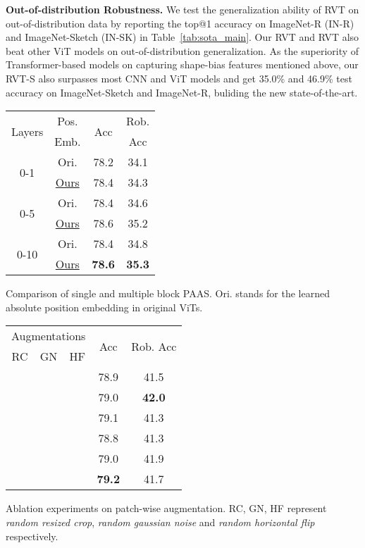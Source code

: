 \documentclass[10pt,twocolumn,letterpaper]{article}
\makeatletter
\newcommand{\tablestyle}[2]{\setlength{\tabcolsep}{#1}\renewcommand{\arraystretch}{#2}\centering\footnotesize}
\newcommand{\cmark}{\ding{51}}\newcommand{\tabincell}[2]{\begin{tabular}{@{}#1@{}}#2\end{tabular}}
\makeatother
\begin{document}
\textbf{Out-of-distribution Robustness.} We test the generalization ability of RVT on out-of-distribution data by reporting the top@1 accuracy on ImageNet-R (IN-R) and ImageNet-Sketch (IN-SK) in Table~\ref{tab:sota_main}. Our RVT and RVT also beat other ViT models on out-of-distribution generalization. As the superiority of Transformer-based models on capturing shape-bias features mentioned above, our RVT-S also surpasses most CNN and ViT models and get 35.0\% and 46.9\% test accuracy on ImageNet-Sketch and ImageNet-R, buliding the new state-of-the-art. 
\begin{minipage}{\textwidth}
\begin{minipage}[t]{0.216\textwidth}
\makeatletter{}
\small
    \centering
     \tablestyle{5pt}{1.05}
\begin{tabular}{c|c|c|c}
\toprule

\multirow{2}{*}{Layers} & Pos. & \multirow{2}{*}{Acc} & Rob. \\
& Emb. &  & Acc \\
\midrule
 \multirow{2}{*}{0-1} & Ori. & 78.2 & 34.1 \\
& \underline{Ours} & 78.4 & 34.3 \\
 \multirow{2}{*}{0-5} & Ori. & 78.4 & 34.6 \\
& \underline{Ours} & 78.6 & 35.2 \\
 \multirow{2}{*}{0-10} & Ori. & 78.4 & 34.8 \\
& \underline{Ours} & \textbf{78.6} &  \textbf{35.3} \\
\bottomrule
\end{tabular}

\caption{Comparison of single and multiple block PAAS. Ori. stands for the learned absolute position embedding in original ViTs.}
\label{ablate:1}
\end{minipage}
\begin{minipage}[t]{0.255\textwidth}
\makeatletter{}
\small
    \centering
     \tablestyle{5pt}{1.05}
\begin{tabular}{c|c|c|c|c}
\toprule

\multicolumn{3}{c|}{Augmentations} & \multirow{2}{*}{Acc} & \multirow{2}{*}{Rob. Acc} \\
 RC & GN & HF & & \\
\midrule
\cmark & &  & 78.9 & 41.5 \\
 & \cmark &  & 79.0 & \textbf{42.0} \\
 & & \cmark & 79.1  & 41.3 \\
\cmark &  & \cmark & 78.8 & 41.3 \\
 & \cmark & \cmark & 79.0 & 41.9 \\
\cmark & \cmark & \cmark & \textbf{79.2} & 41.7 \\
\bottomrule
\end{tabular}

\caption{Ablation experiments on patch-wise augmentation. RC, GN, HF represent \emph{random resized crop}, \emph{random gaussian noise} and \emph{random horizontal flip} respectively.}
\label{ablate:2}
\vspace{-10pt}
\end{minipage}
\end{minipage}
\end{document}
